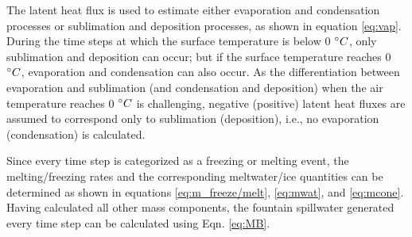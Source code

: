 The latent heat flux is used to estimate either evaporation and condensation processes or sublimation and
deposition processes, as shown in equation \ref{eq:vap}. During the time steps at which the surface temperature
is below 0 $^{\circ} C$, only sublimation and deposition can occur; but if the surface temperature reaches 0
$^{\circ} C$, evaporation and condensation can also occur. As the differentiation between evaporation and
sublimation (and condensation and deposition) when the air temperature reaches 0 $^{\circ} C$ is challenging,
negative (positive) latent heat fluxes are assumed to correspond only to sublimation (deposition), i.e., no
evaporation (condensation) is calculated.

Since every time step is categorized as a freezing or melting event, the melting/freezing rates and the
corresponding meltwater/ice quantities can be determined as shown in equations \ref{eq:m_freeze/melt},
\ref{eq:mwat}, and \ref{eq:mcone}. Having calculated all other mass components, the fountain spillwater generated
every time step can be calculated using Eqn. \ref{eq:MB}.

